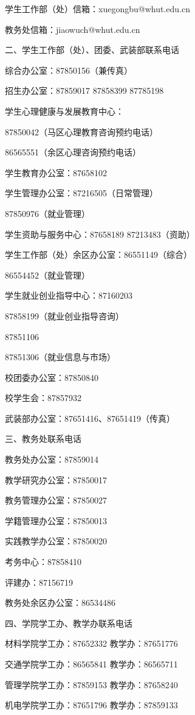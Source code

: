 \documentclass[UTF8,12pt,a4paper]{report}
\begin{document}
学生工作部（处）信箱：xuegongbu@whut.edu.cn

教务处信箱：jiaowuch@whut.edu.cn



二、学生工作部（处）、团委、武装部联系电话

综合办公室：87850156（兼传真）

招生办公室：87859017 87858399 87785198

学生心理健康与发展教育中心：

87850042（马区心理教育咨询预约电话）

86565551（余区心理咨询预约电话）

学生教育办公室：87658102

学生管理办公室：87216505（日常管理）

87850976（就业管理）

学生资助与服务中心：87658189 87213483（资助）

学生工作部（处）余区办公室：86551149（综合）

86554452（就业管理）

学生就业创业指导中心：87160203

87858199（就业创业指导咨询）

87851106

87851306（就业信息与市场）

校团委办公室：87850840

校学生会：87857932

武装部办公室：87651416、87651419（传真）



三、教务处联系电话

教务处办公室：87859014

教学研究办公室：87850017

教务管理办公室：87850027

学籍管理办公室：87850013

实践教学办公室：87850020

考务中心：87858410

评建办：87156719

教务处余区办公室：86534486



四、学院学工办、教学办联系电话

材料学院学工办：87652332 教学办：87651776

交通学院学工办：86565841 教学办：86565711

管理学院学工办：87859153 教学办：87658240

机电学院学工办：87651796 教学办：87859133
\end{document}
